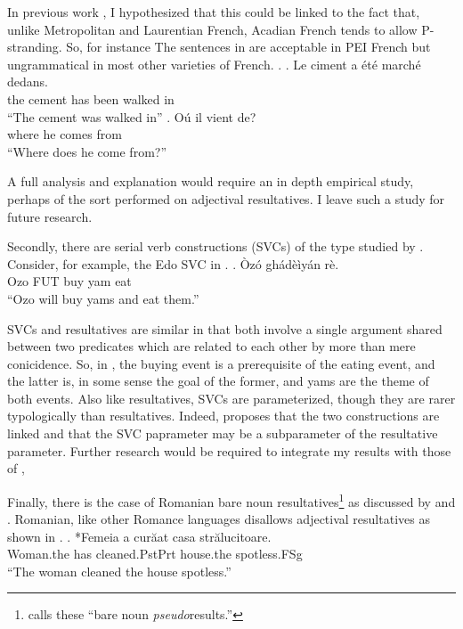\documentclass[MilwayThesis]{subfiles}
\begin{document}
In previous work \parencite{milway2015generals}, I hypothesized that this could be linked to the fact that, unlike Metropolitan and Laurentian French, Acadian French tends to allow P-stranding.
So, for instance The sentences in \Next are acceptable in PEI French but ungrammatical in most other varieties of French.
\ex.
\ag. Le ciment a \'{e}t\'{e} march\'{e} dedans.\\
the cement has been walked in\\
``The cement was walked in''
\bg. O\'{u} il vient de?\\
where he comes from\\
``Where does he come from?'' \parencite{roberge2013preposition}

A full analysis and explanation would require an in depth empirical study, perhaps of the sort \textcite{snyder1995language} performed on adjectival resultatives.
I leave such a study for future research.

Secondly, there are serial verb constructions (SVCs) of the type studied by \textcite{stewart2013serial,bakerstewart1999double}.
Consider, for example, the Edo SVC in \Next.
\exg. \`{O}z\'{o}  gh\'{a}d\`{e}ìy\'{a}n    r\`{e}.\\
Ozo  FUT   buy   yam    eat\\
``Ozo will buy yams and eat them.'' \parencite{bakerstewart1999double}

SVCs and resultatives are similar in that both involve a single argument shared between two predicates which are related to each other by more than mere conicidence.
So, in \Last, the buying event is a prerequisite of the eating event, and the latter is, in some sense the goal of the former, and yams are the theme of both events.
Also like resultatives, SVCs are parameterized, though they are rarer typologically than resultatives.
Indeed, \textcite{stewart2013serial} proposes that the two constructions are linked and that the SVC paprameter may be a subparameter of the resultative parameter.
Further research would be required to integrate my results with those of \textcite{stewart2013serial,bakerstewart1999double},

Finally, there is the case of Romanian bare noun resultatives\footnote{\textcite{irimia2012secondary} calls these ``bare noun \textit{pseudo}results.''} as discussed by \textcite[220--224]{irimia2012secondary} and \textcite{farkas2011predicative}.
Romanian, like other Romance languages disallows adjectival resultatives as shown in \Next.
\exg. *Femeia a cur\u{a}at casa str\u{a}lucitoare.\footnotemark\\
Woman.the has cleaned.PstPrt house.the spotless.FSg\\
``The woman cleaned the house spotless.''\parencite{irimia2012secondary}
\end{document}

